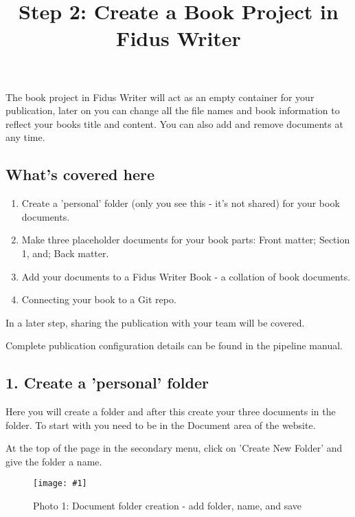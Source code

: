 \documentclass{article}
\newlength{\imgwidth}
\newcommand\scaledgraphics[2]{%
                
\settowidth{\imgwidth}{\texttt{[image: \#1]}}%
                
\setlength{\imgwidth}{\minof{\imgwidth}{#2\textwidth}}%
                
\texttt{[image: \#1]}%
                
}
\begin{document}
\title{Step 2: Create a Book Project in Fidus Writer}

\maketitle


The book project in Fidus Writer will act as an empty container for your publication, later on you can change all the file names and book information to reflect your books title and content. You can also add and remove documents at any time.


\subsection{What's covered here}\label{H4535132}


\begin{enumerate}
\item Create a 'personal' folder (only you see this - it's not shared) for your book documents.


\item Make three placeholder documents for your book parts: Front matter; Section 1, and; Back matter.


\item Add your documents to a Fidus Writer Book - a collation of book documents.


\item Connecting your book to a Git repo.


\end{enumerate}

In a later step, sharing the publication with your team will be covered.


Complete publication configuration details can be found in the pipeline manual.


\subsection{1. Create a 'personal' folder}\label{H4439255}



Here you will create a folder and after this create your three documents in the folder. To start with you need to be in the Document area of the website. 


At the top of the page in the secondary menu, click on 'Create New Folder' and give the folder a name.

\begin{figure}
\scaledgraphics{8c499ef1-2708-4cab-a7c0-7b428719cf92.png}{1}
\caption*{Photo 1: Document folder creation - add folder, name, and save}\label{F89073221}
\end{figure}
\end{document}
